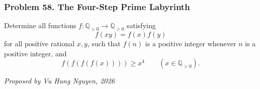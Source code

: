 \subsubsection*{Problem 58. The Four-Step Prime Labyrinth}

\begin{exercisebox}[hard]

Determine all functions $f:\mathbb Q_{>0}\to\mathbb Q_{>0}$ satisfying
\[
f(xy)=f(x)f(y)
\]
for all positive rational $x,y$, such that $f(n)$ is a positive integer whenever $n$ is a positive integer, and
\[
\boxed{\qquad
f(f(f(f(x))))\ge x^4
\qquad(x\in\mathbb Q_{>0}).
\qquad}
\]

\begin{flushright}
\textit{Proposed by Vu Hung Nguyen, 2026}
\end{flushright}


\end{exercisebox}
